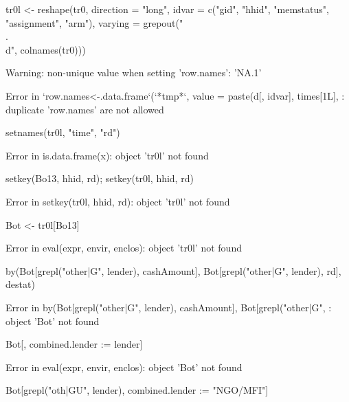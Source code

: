 \begin{Schunk}
\begin{Sinput}
tr0l <- reshape(tr0, direction = "long", 
	idvar = c("gid", "hhid", "memstatus", "assignment", "arm"),
	varying = grepout("\\.\\d", colnames(tr0)))
\end{Sinput}
\begin{Soutput}
Warning: non-unique value when setting 'row.names': 'NA.1'
\end{Soutput}
\begin{Soutput}
Error in `row.names<-.data.frame`(`*tmp*`, value = paste(d[, idvar], times[1L], : duplicate 'row.names' are not allowed
\end{Soutput}
\begin{Sinput}
setnames(tr0l, "time", "rd")
\end{Sinput}
\begin{Soutput}
Error in is.data.frame(x): object 'tr0l' not found
\end{Soutput}
\begin{Sinput}
setkey(Bo13, hhid, rd); setkey(tr0l, hhid, rd)
\end{Sinput}
\begin{Soutput}
Error in setkey(tr0l, hhid, rd): object 'tr0l' not found
\end{Soutput}
\begin{Sinput}
Bot <- tr0l[Bo13]
\end{Sinput}
\begin{Soutput}
Error in eval(expr, envir, enclos): object 'tr0l' not found
\end{Soutput}
\begin{Sinput}
by(Bot[grepl("other|G", lender), cashAmount], Bot[grepl("other|G", lender), rd], destat)
\end{Sinput}
\begin{Soutput}
Error in by(Bot[grepl("other|G", lender), cashAmount], Bot[grepl("other|G", : object 'Bot' not found
\end{Soutput}
\begin{Sinput}
Bot[, combined.lender := lender]
\end{Sinput}
\begin{Soutput}
Error in eval(expr, envir, enclos): object 'Bot' not found
\end{Soutput}
\begin{Sinput}
Bot[grepl("oth|GU", lender), combined.lender := "NGO/MFI"]
\end{Sinput}
\begin{Soutput}

\end{Soutput}
\end{Schunk}

